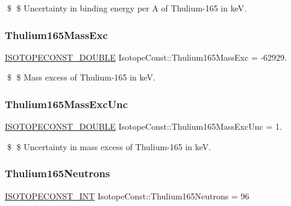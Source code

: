 \$ \$ Uncertainty in binding energy per A of Thulium-\/165 in keV. \mbox{\label{group___isotope_const-_thulium-_tm165_ga828df10ff671abb15a02335dacbb1605}} 
\subsubsection{\texorpdfstring{Thulium165\+Mass\+Exc}{Thulium165MassExc}}
{\footnotesize\ttfamily \mbox{\hyperlink{group___isotope_const-_macros_ga8f45a7272ce02c0b4c65c44636ed719a}{I\+S\+O\+T\+O\+P\+E\+C\+O\+N\+S\+T\+\_\+\+D\+O\+U\+B\+LE}} Isotope\+Const\+::\+Thulium165\+Mass\+Exc = -\/62929.}

\$ \$ Mass excess of Thulium-\/165 in keV. \mbox{\label{group___isotope_const-_thulium-_tm165_ga09de70b081506450d6dc77dcded2a708}} 
\subsubsection{\texorpdfstring{Thulium165\+Mass\+Exc\+Unc}{Thulium165MassExcUnc}}
{\footnotesize\ttfamily \mbox{\hyperlink{group___isotope_const-_macros_ga8f45a7272ce02c0b4c65c44636ed719a}{I\+S\+O\+T\+O\+P\+E\+C\+O\+N\+S\+T\+\_\+\+D\+O\+U\+B\+LE}} Isotope\+Const\+::\+Thulium165\+Mass\+Exc\+Unc = 1.}

\$ \$ Uncertainty in mass excess of Thulium-\/165 in keV. \mbox{\label{group___isotope_const-_thulium-_tm165_ga4d381314182f57e61365e37e5a0a3836}} 
\subsubsection{\texorpdfstring{Thulium165\+Neutrons}{Thulium165Neutrons}}
{\footnotesize\ttfamily \mbox{\hyperlink{group___isotope_const-_macros_ga5f18360b3e99483a35c32d789e62621c}{I\+S\+O\+T\+O\+P\+E\+C\+O\+N\+S\+T\+\_\+\+I\+NT}} Isotope\+Const\+::\+Thulium165\+Neutrons = 96}

